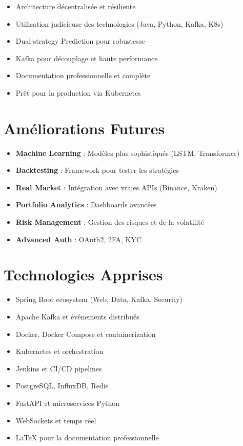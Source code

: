 \documentclass[12pt,a4paper,twoside]{report}
\begin{document}
\begin{itemize}
    \item Architecture décentralisée et résiliente
    \item Utilisation judicieuse des technologies (Java, Python, Kafka, K8s)
    \item Dual-strategy Prediction pour robustesse
    \item Kafka pour découplage et haute performance
    \item Documentation professionnelle et complète
    \item Prêt pour la production via Kubernetes
\end{itemize}

\section{Améliorations Futures}

\begin{itemize}
    \item \textbf{Machine Learning} : Modèles plus sophistiqués (LSTM, Transformer)
    \item \textbf{Backtesting} : Framework pour tester les stratégies
    \item \textbf{Real Market} : Intégration avec vraies APIs (Binance, Kraken)
    \item \textbf{Portfolio Analytics} : Dashboards avancées
    \item \textbf{Risk Management} : Gestion des risques et de la volatilité
    \item \textbf{Advanced Auth} : OAuth2, 2FA, KYC
\end{itemize}

\section{Technologies Apprises}

\begin{itemize}
    \item Spring Boot ecosystem (Web, Data, Kafka, Security)
    \item Apache Kafka et événements distribués
    \item Docker, Docker Compose et containerization
    \item Kubernetes et orchestration
    \item Jenkins et CI/CD pipelines
    \item PostgreSQL, InfluxDB, Redis
    \item FastAPI et microservices Python
    \item WebSockets et temps réel
    \item LaTeX pour la documentation professionnelle
\end{itemize}
\end{document}
